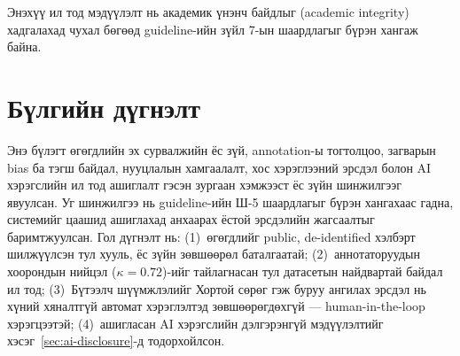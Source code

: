 Энэхүү ил тод мэдүүлэлт нь академик үнэнч байдлыг (academic integrity)
хадгалахад чухал бөгөөд guideline-ийн зүйл 7-ын шаардлагыг бүрэн хангаж байна.

\section{Бүлгийн дүгнэлт}

Энэ бүлэгт өгөгдлийн эх сурвалжийн ёс зүй, annotation-ы тогтолцоо, загварын
bias ба тэгш байдал, нууцлалын хамгаалалт, хос хэрэглээний эрсдэл болон AI
хэрэгслийн ил тод ашиглалт гэсэн зургаан хэмжээст ёс зүйн шинжилгээг явуулсан.
Уг шинжилгээ нь guideline-ийн Ш-5 шаардлагыг бүрэн хангахаас гадна, системийг
цаашид ашиглахад анхаарах ёстой эрсдэлийн жагсаалтыг баримтжуулсан. Гол дүгнэлт
нь: (1)~өгөгдлийг public, de-identified хэлбэрт шилжүүлсэн тул хууль, ёс зүйн
зөвшөөрөл баталгаатай; (2)~аннотаторуудын хоорондын нийцэл ($\kappa\!=\!0.72$)-ийг
тайлагнасан тул датасетын найдвартай байдал ил тод; (3)~Бүтээлч шүүмжлэлийг
Хортой сөрөг гэж буруу ангилах эрсдэл нь хүний хяналтгүй автомат хэрэглэлтэд
зөвшөөрөгдөхгүй --- human-in-the-loop хэрэгцээтэй; (4)~ашигласан AI хэрэгслийн
дэлгэрэнгүй мэдүүлэлтийг хэсэг~\ref{sec:ai-disclosure}-д тодорхойлсон.

